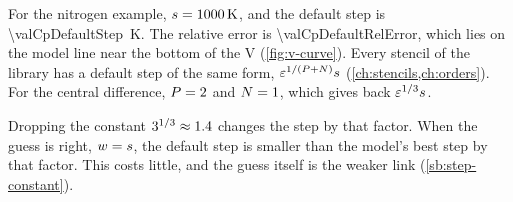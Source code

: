 For the nitrogen example, $s = \SI{1000}{\kelvin}$, and the default step is \SI{\valCpDefaultStep}{\kelvin}. The
relative error is \num{\valCpDefaultRelError}, which lies on the model line near the bottom of the V
(\cref{fig:v-curve}). Every stencil of the library has a default step of the same form,
$\varepsilon^{1/(P + N)} s$ (\cref{ch:stencils,ch:orders}). For the central difference, $P = 2$
and $N = 1$, which gives back $\varepsilon^{1/3} s$.

Dropping the constant $3^{1/3} \approx \num{1.4}$ changes the step by that factor. When
the guess is right, $w = s$, the default step is smaller than the model's best step by that factor. This costs
little, and
the guess itself is the weaker link (\cref{sb:step-constant}).

